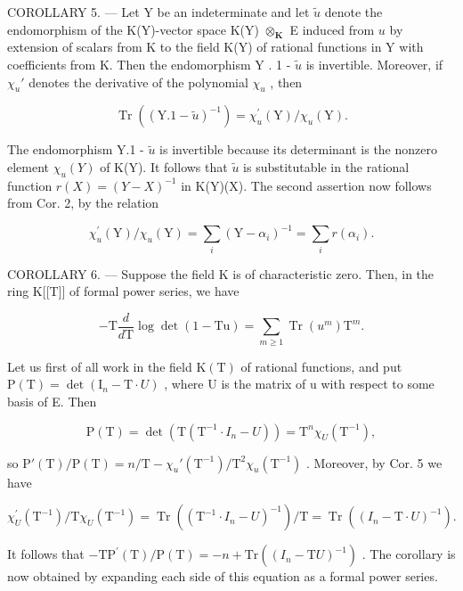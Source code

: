 COROLLARY 5. --- Let Y be an indeterminate and let \(\tilde{u}\) denote the endomorphism of the K(Y)-vector space K(Y) \(\otimes_{\mathbf{K}}\) E induced from \(u\) by extension of scalars from K to the field K(Y) of rational functions in Y with coefficients from K. Then the endomorphism Y . 1 - \(\tilde{u}\) is invertible. Moreover, if \(\chi_u'\) denotes the derivative of the polynomial \(\chi_u\) , then

\[
\operatorname{Tr} \left(\left(\mathrm{Y}. 1 - \tilde {u}\right) ^ {- 1}\right) = \chi_ {u} ^ {\prime} (\mathrm{Y}) / \chi_ {u} (\mathrm{Y}).
\]

The endomorphism Y.1 - \(\tilde{u}\) is invertible because its determinant is the nonzero element \(\chi_u(Y)\) of K(Y). It follows that \(\tilde{u}\) is substitutable in the rational function \(r(X) = (Y - X)^{-1}\) in K(Y)(X). The second assertion now follows from Cor. 2, by the relation

\[
\chi_ {u} ^ {\prime} (\mathrm{Y}) / \chi_ {u} (\mathrm{Y}) = \sum_ {i} \left(\mathrm{Y} - \alpha_ {i}\right) ^ {- 1} = \sum_ {i} r \left(\alpha_ {i}\right).
\]

COROLLARY 6. --- Suppose the field K is of characteristic zero. Then, in the ring K{[}{[}T{]}{]} of formal power series, we have

\[
- \mathrm{T} \frac {d}{d \mathrm{T}} \log \det (1 - \mathrm{Tu}) = \sum_ {m \geqslant 1} \operatorname{Tr} \left(u ^ {m}\right) \mathrm{T} ^ {m}.
\]

Let us first of all work in the field \(\mathrm{K}(\mathrm{T})\) of rational functions, and put \(\mathrm{P}(\mathrm{T}) = \det(\mathrm{I}_{n} - \mathrm{T} \cdot U)\) , where U is the matrix of u with respect to some basis of E. Then

\[
\mathrm{P} (\mathrm{T}) = \det \left(\mathrm{T} \left(\mathrm{T} ^ {- 1} \cdot I _ {n} - U\right)\right) = \mathrm{T} ^ {n} \chi_ {U} \left(\mathrm{T} ^ {- 1}\right),
\]

so \(\mathrm{P}'(\mathrm{T}) / \mathrm{P}(\mathrm{T}) = n / \mathrm{T} - \chi_u'(\mathrm{T}^{-1}) / \mathrm{T}^2\chi_u(\mathrm{T}^{-1})\) . Moreover, by Cor. 5 we have

\[
\chi_ {U} ^ {\prime} \left(\mathrm{T} ^ {- 1}\right) / \mathrm{T} \chi_ {U} \left(\mathrm{T} ^ {- 1}\right) = \operatorname{Tr} \left(\left(\mathrm{T} ^ {- 1} \cdot I _ {n} - U\right) ^ {- 1}\right) / \mathrm{T} = \operatorname{Tr} \left(\left(I _ {n} - \mathrm{T} \cdot U\right) ^ {- 1}\right).
\]

It follows that \(-\mathrm{TP}^{\prime}(\mathrm{T})/\mathrm{P}(\mathrm{T})=-n+\mathrm{Tr}\left((I_{n}-\mathrm{T}U)^{-1}\right)\) . The corollary is now obtained by expanding each side of this equation as a formal power series.

